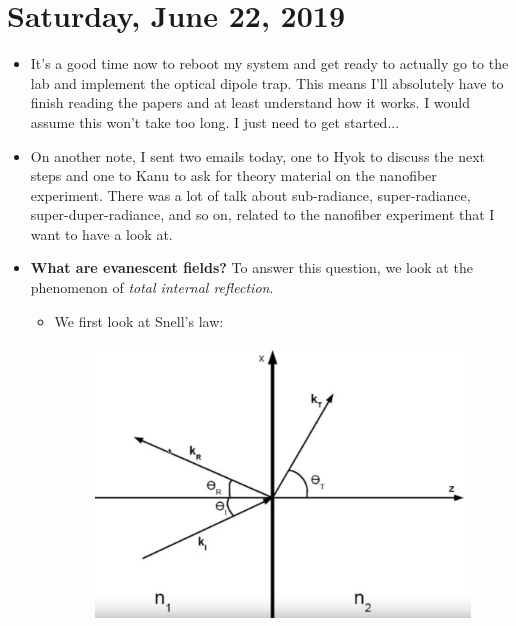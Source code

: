 \documentclass{report}
\theoremstyle{definition}
\begin{document}
\section{Saturday, June 22, 2019}
\begin{itemize}
	\item It's a good time now to reboot my system and get ready to actually go to the lab and implement the optical dipole trap. This means I'll absolutely have to finish reading the papers and at least understand how it works. I would assume this won't take too long. I just need to get started...
	
	\item On another note, I sent two emails today, one to Hyok to discuss the next steps and one to Kanu to ask for theory material on the nanofiber experiment. There was a lot of talk about sub-radiance, super-radiance, super-duper-radiance, and so on, related to the nanofiber experiment that I want to have a look at. 
	
	\item \textbf{What are evanescent fields?} To answer this question, we look at the phenomenon of \textit{total internal reflection}. 
	
	\begin{itemize}
		\item We first look at Snell's law:
		\begin{figure}[!htb]
			\centering
			\includegraphics[scale=0.3]{snells-law}
		\end{figure}
	

\end{itemize}
\end{itemize}
\end{document}

